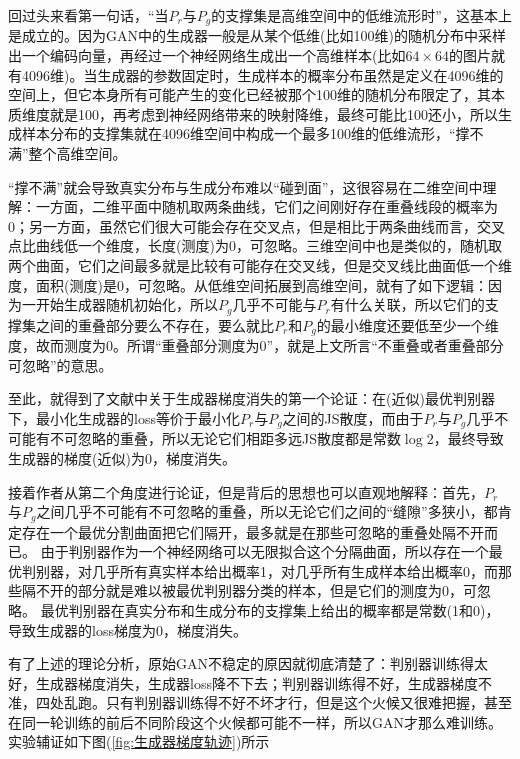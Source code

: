             \par
            回过头来看第一句话，“当$ P_r $与$ P_g $的支撑集是高维空间中的低维流形时”，这基本上是成立的。因为GAN中的生成器一般是从某个低维(比如100维)的随机分布中采样出一个编码向量，再经过一个神经网络生成出一个高维样本(比如$64\times 64$的图片就有4096维)。当生成器的参数固定时，生成样本的概率分布虽然是定义在4096维的空间上，但它本身所有可能产生的变化已经被那个100维的随机分布限定了，其本质维度就是100，再考虑到神经网络带来的映射降维，最终可能比100还小，所以生成样本分布的支撑集就在4096维空间中构成一个最多100维的低维流形，“撑不满”整个高维空间。
            \par
            “撑不满”就会导致真实分布与生成分布难以“碰到面”，这很容易在二维空间中理解：一方面，二维平面中随机取两条曲线，它们之间刚好存在重叠线段的概率为0；另一方面，虽然它们很大可能会存在交叉点，但是相比于两条曲线而言，交叉点比曲线低一个维度，长度(测度)为0，可忽略。三维空间中也是类似的，随机取两个曲面，它们之间最多就是比较有可能存在交叉线，但是交叉线比曲面低一个维度，面积(测度)是0，可忽略。从低维空间拓展到高维空间，就有了如下逻辑：因为一开始生成器随机初始化，所以$ P_g $几乎不可能与$P_r$有什么关联，所以它们的支撑集之间的重叠部分要么不存在，要么就比$ P_r $和$ P_g $的最小维度还要低至少一个维度，故而测度为0。所谓“重叠部分测度为0”，就是上文所言“不重叠或者重叠部分可忽略”的意思。
            \par
            至此，就得到了文献\cite{2017.Arjovsky}中关于生成器梯度消失的第一个论证：在(近似)最优判别器下，最小化生成器的loss等价于最小化$ P_r $与$ P_g $之间的JS散度，而由于$ P_r $与$ P_g $几乎不可能有不可忽略的重叠，所以无论它们相距多远JS散度都是常数$\log 2$，最终导致生成器的梯度(近似)为0，梯度消失。
            \par
            接着作者从第二个角度进行论证，但是背后的思想也可以直观地解释：首先，$P_r $与$ P_g $之间几乎不可能有不可忽略的重叠，所以无论它们之间的“缝隙”多狭小，都肯定存在一个最优分割曲面把它们隔开，最多就是在那些可忽略的重叠处隔不开而已。
            由于判别器作为一个神经网络可以无限拟合这个分隔曲面，所以存在一个最优判别器，对几乎所有真实样本给出概率1，对几乎所有生成样本给出概率0，而那些隔不开的部分就是难以被最优判别器分类的样本，但是它们的测度为0，可忽略。
            最优判别器在真实分布和生成分布的支撑集上给出的概率都是常数(1和0)，导致生成器的loss梯度为0，梯度消失。
            \par
            有了上述的理论分析，原始GAN不稳定的原因就彻底清楚了：判别器训练得太好，生成器梯度消失，生成器loss降不下去；判别器训练得不好，生成器梯度不准，四处乱跑。只有判别器训练得不好不坏才行，但是这个火候又很难把握，甚至在同一轮训练的前后不同阶段这个火候都可能不一样，所以GAN才那么难训练。实验辅证如下图(\ref{fig:生成器梯度轨迹})所示
